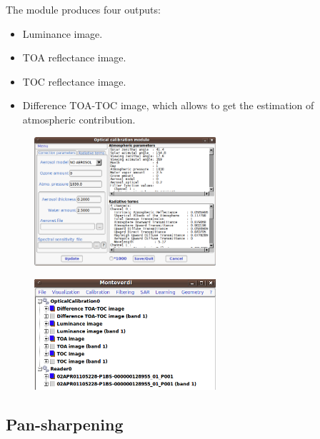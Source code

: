 The module produces four outputs:

\begin{itemize}
\item Luminance image.
\item TOA reflectance image.
\item TOC reflectance image.
\item Difference TOA-TOC image, which allows to get the estimation of atmospheric contribution.
\end{itemize}

\begin{figure}
  \center
  \includegraphics[width=0.6\textwidth]{../Art/MonteverdiImages/monteverdi_optical_calibration.png}
  \label{fig:opticalcalibration}
\end{figure}


\begin{figure}
  \center
  \includegraphics[width=0.6\textwidth]{../Art/MonteverdiImages/monteverdi_optical_calibration_outputs.png}
  \label{fig:opticalcalibrationoutput}
\end{figure}

\subsection{Pan-sharpening}\label{ssec:pxs}

